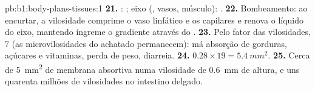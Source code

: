 \begin{solution}{pb:b1:body-plans-tissues:1}
\textbf{21.} : ; eixo (, vasos,
músculo): .
\textbf{22.} Bombeamento: ao encurtar, a vilosidade comprime o vaso
linfático e os capilares e renova o líquido do eixo, mantendo íngreme o
gradiente através do .
\textbf{23.} Pelo fator das vilosidades, $7$ (as microvilosidades do
 achatado permanecem): má absorção de gorduras, açúcares e
vitaminas, perda de peso, diarreia.
\textbf{24.} $0.28\times 19 = \qty{5.4}{mm^2}$.
\textbf{25.} Cerca de \qty{5}{mm^2} de membrana absortiva numa
vilosidade de \qty{0.6}{mm} de altura, e uns quarenta milhões de
vilosidades no intestino delgado.
\end{solution}
